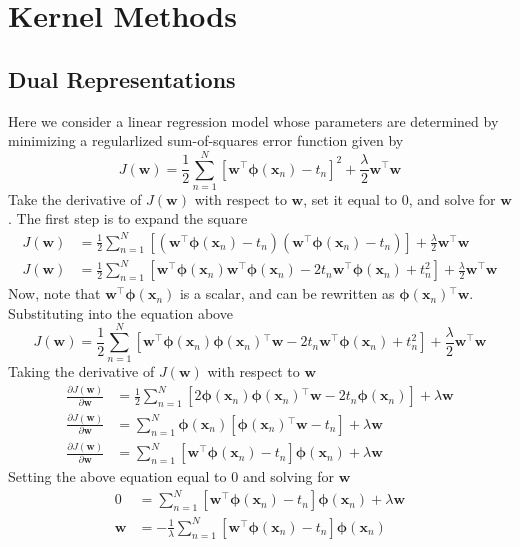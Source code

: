 \documentclass[12pt]{article}
\newcommand{\w}{\mathbf{w}}
\newcommand{\sumN}{\sum \limits_{n=1}^N}
\newcommand{\Jw}{J\left(\w{}\right)}
\newcommand{\wTransW}{\w{}^\top\w{}}
\newcommand{\dJdW}{\frac{\partial \Jw{}}{\partial \w{}}}
\newcommand{\phiX}{\mathbf{\phi}\left(\mathbf{x}_n\right)}
\newcommand{\wTransPhi}{\w{}^\top\phiX{}}
\newcommand{\phiTransW}{\phiX{}^\top\w{}}
\begin{document}
\section{Kernel Methods}
\subsection{Dual Representations}
Here we consider a linear regression model whose parameters are determined by
minimizing a regularlized sum-of-squares error function given by
%
\begin{equation*}
  \Jw{} = \frac{1}{2}\sumN{}\left[\wTransPhi{} - t_n\right]^2 +
  \frac{\lambda}{2}\wTransW{}
\end{equation*}
%
Take the derivative of $\Jw{}$ with respect to $\w{}$, set it equal to $0$, and
solve for $\w{}$. The first step is to expand the square
%
\begin{align*}
  \Jw{} &= \frac{1}{2}\sumN{}
  \left[\left(\wTransPhi{} - t_n\right)\left(\wTransPhi{} - t_n\right)\right] +
  \frac{\lambda}{2}\wTransW{} \\
  \Jw{} &= \frac{1}{2}\sumN{}
  \left[\wTransPhi{}\wTransPhi{} - 2t_n\wTransPhi{} + t_n^2\right] +
  \frac{\lambda}{2}\wTransW{}
\end{align*}
%
Now, note that $\wTransPhi{}$ is a scalar, and can be rewritten as
$\phiTransW{}$. Substituting into the equation above
%
\begin{equation*}
  \Jw{} = \frac{1}{2}\sumN{}
  \left[\wTransPhi{}\phiTransW{} - 2t_n\wTransPhi{} + t_n^2\right] +
  \frac{\lambda}{2}\wTransW{}
\end{equation*}
%
Taking the derivative of $\Jw{}$ with respect to $\w{}$
%
\begin{align*}
  \dJdW{} &= \frac{1}{2}\sumN{}
  \left[2\phiX{}\phiX{}^\top\w{} - 2t_n\phiX{}\right] + \lambda\w{} \\
  \dJdW{} &= \sumN{}\phiX{}\left[\phiTransW{} - t_n\right] + \lambda\w{} \\
  \dJdW{} &= \sumN{}\left[\wTransPhi{} - t_n\right]\phiX{} + \lambda\w{}  
\end{align*}
%
Setting the above equation equal to $0$ and solving for $\w{}$
\begin{align*}
  0 &= \sumN{}\left[\wTransPhi{} - t_n\right]\phiX{} + \lambda\w{} \\
  \w{} &= -\frac{1}{\lambda}\sumN{}\left[\wTransPhi{} - t_n\right]\phiX{}
\end{align*}
\end{document}
